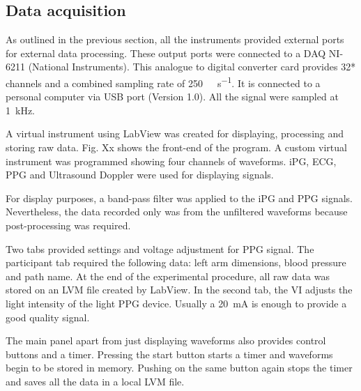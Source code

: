 


\subsection{Data acquisition}
\label{section4.1.2}

As outlined in the previous section, all the instruments provided external ports for external data processing. These output ports were connected to a DAQ NI-6211 (National Instruments). This analogue to digital converter card provides 32* channels and a combined sampling rate of \SI{250}{\kilo\sample\per\second}. It is connected to a personal computer via USB port (Version 1.0). All the signal were sampled at \SI{1}{\kilo\hertz}.


A virtual instrument using LabView was created for displaying, processing and storing raw data. Fig. Xx shows the front-end of the program. A custom virtual instrument was programmed showing four channels of waveforms. iPG, ECG, PPG and Ultrasound Doppler were used for displaying signals.


For display purposes, a band-pass filter was applied to the iPG and PPG signals. Nevertheless, the data recorded only was from the unfiltered waveforms because post-processing was required.  


Two tabs provided settings and voltage adjustment for PPG signal. The participant tab required the following data: left arm dimensions, blood pressure and path name. At the end of the experimental procedure, all raw data was stored on an LVM file created by LabView. In the second tab, the VI adjusts the light intensity of the light PPG device. Usually a \SI{20}{\milli\ampere} is enough to provide a good quality signal. 

The main panel apart from just displaying waveforms also provides control buttons and a timer.  Pressing the start button starts a timer and waveforms begin to be stored in memory. Pushing on the same button again stops the timer and saves all the data in a local LVM file. 

